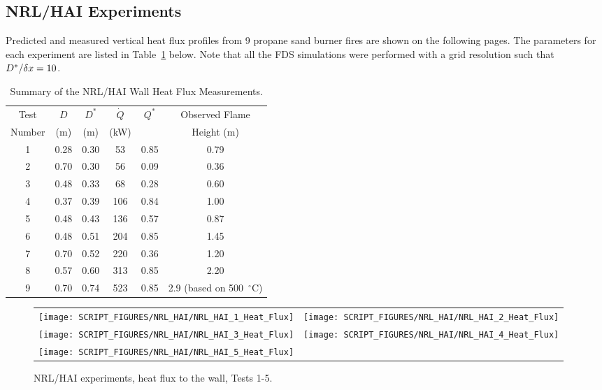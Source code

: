 \clearpage



\subsection{NRL/HAI Experiments}

Predicted and measured vertical heat flux profiles from 9 propane sand burner fires are shown on the following pages. The parameters for each
experiment are listed in Table~\ref{NRL/HAI_Parameters} below. Note that all the FDS simulations were performed with a grid resolution such that
$D^*/\delta x=10$.

\begin{table}[ht]
\caption{Summary of the NRL/HAI Wall Heat Flux Measurements. }
\begin{center}
\begin{tabular}{|c|c|c|c|c|c|}
\hline
Test     & $D$     & $D^*$      & $\dot{Q}$   & $Q^*$   & Observed  Flame \\
Number   & (m)     & (m)        & (kW)        &         & Height (m)      \\ \hline \hline
1        & 0.28    & 0.30       &  53         & 0.85    & 0.79            \\ \hline
2        & 0.70    & 0.30       &  56         & 0.09    & 0.36            \\ \hline
3        & 0.48    & 0.33       &  68         & 0.28    & 0.60            \\ \hline
4        & 0.37    & 0.39       &  106        & 0.84    & 1.00            \\ \hline
5        & 0.48    & 0.43       &  136        & 0.57    & 0.87            \\ \hline
6        & 0.48    & 0.51       &  204        & 0.85    & 1.45            \\ \hline
7        & 0.70    & 0.52       &  220        & 0.36    & 1.20            \\ \hline
8        & 0.57    & 0.60       &  313        & 0.85    & 2.20            \\ \hline
9        & 0.70    & 0.74       &  523        & 0.85    & 2.9 (based on 500~$^\circ$C)       \\ \hline
\end{tabular}
\end{center}
\label{NRL/HAI_Parameters}
\end{table}

\newpage

\begin{figure}[p]
\begin{tabular*}{\textwidth}{l@{\extracolsep{\fill}}r}
\texttt{[image: SCRIPT\_FIGURES/NRL\_HAI/NRL\_HAI\_1\_Heat\_Flux]} &
\texttt{[image: SCRIPT\_FIGURES/NRL\_HAI/NRL\_HAI\_2\_Heat\_Flux]} \\
\texttt{[image: SCRIPT\_FIGURES/NRL\_HAI/NRL\_HAI\_3\_Heat\_Flux]} &
\texttt{[image: SCRIPT\_FIGURES/NRL\_HAI/NRL\_HAI\_4\_Heat\_Flux]} \\
\texttt{[image: SCRIPT\_FIGURES/NRL\_HAI/NRL\_HAI\_5\_Heat\_Flux]} &
\end{tabular*}
\label{NRL_HAI_1}
\caption{NRL/HAI experiments, heat flux to the wall, Tests 1-5.}
\end{figure}

